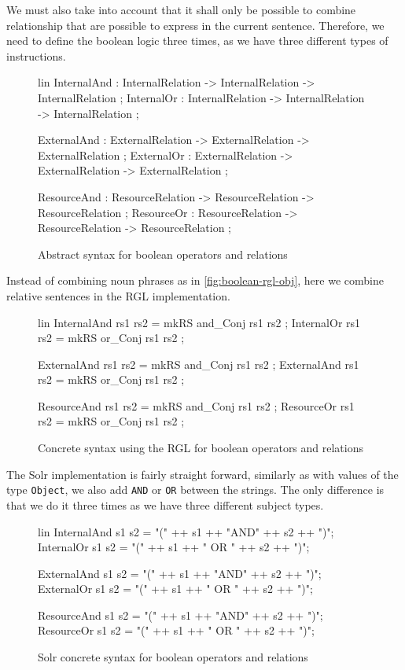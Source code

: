 We must also take into account that it shall only be possible to combine relationship that are possible to express in the current sentence. Therefore, we need to define the boolean logic three times, as we have three different types of instructions.

\begin{figure}[H]
\begin{code}
lin
  InternalAnd : InternalRelation -> InternalRelation -> InternalRelation ;
  InternalOr : InternalRelation -> InternalRelation -> InternalRelation ;

  ExternalAnd : ExternalRelation -> ExternalRelation -> ExternalRelation ;
  ExternalOr : ExternalRelation -> ExternalRelation -> ExternalRelation ;
 	  
  ResourceAnd : ResourceRelation -> ResourceRelation -> ResourceRelation ;
  ResourceOr : ResourceRelation -> ResourceRelation -> ResourceRelation ;
\end{code}
\caption{Abstract syntax for boolean operators and relations\label{fig:boolean-abstract-relations}}
\end{figure}

Instead of combining noun phrases as in \autoref{fig:boolean-rgl-obj}, here we combine relative sentences in the RGL implementation.

\begin{figure}[H]
\begin{code}
lin
  InternalAnd rs1 rs2 = mkRS and_Conj rs1 rs2 ;
  InternalOr rs1 rs2 = mkRS or_Conj rs1 rs2 ;
	  
  ExternalAnd rs1 rs2 = mkRS and_Conj rs1 rs2 ;
  ExternalAnd rs1 rs2 = mkRS or_Conj rs1 rs2 ;
	  
  ResourceAnd rs1 rs2 = mkRS and_Conj rs1 rs2 ;
  ResourceOr rs1 rs2 = mkRS or_Conj rs1 rs2 ;
\end{code}
\caption{Concrete syntax using the RGL for boolean operators and relations\label{fig:boolean-rgl-relations}}
\end{figure}

The Solr implementation is fairly straight forward, similarly as with values of the type \texttt{Object}, we also add \texttt{AND} or \texttt{OR} between the strings. The only difference is that we do it three times as we have three different subject types.

\begin{figure}[H]
\begin{code}
lin
  InternalAnd s1 s2 = "(" ++ s1 ++ "AND" ++ s2 ++ ")";
  InternalOr s1 s2 = "(" ++ s1 ++ " OR " ++ s2 ++ ")";

  ExternalAnd s1 s2 = "(" ++ s1 ++ "AND" ++ s2 ++ ")";
  ExternalOr s1 s2 = "(" ++ s1 ++ " OR " ++ s2 ++ ")";

  ResourceAnd s1 s2 = "(" ++ s1 ++ "AND" ++ s2 ++ ")";
  ResourceOr s1 s2 = "(" ++ s1 ++ " OR " ++ s2 ++ ")";
\end{code}
\caption{Solr concrete syntax for boolean operators and relations\label{fig:boolean-solr-relations}}
\end{figure}

